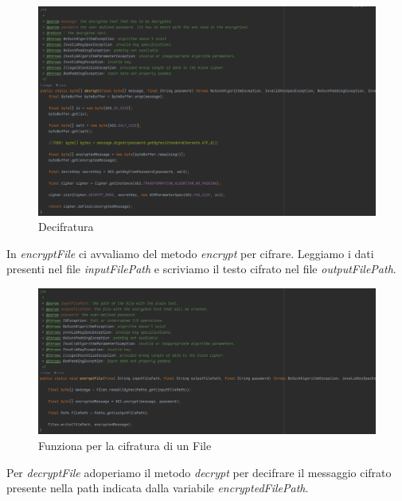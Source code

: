 \begin{figure}[H]
	\centering
	\includegraphics[width=1\textwidth, height=1\textheight, keepaspectratio]{./images/code/java/decrypt.PNG}
	\caption{Decifratura}
	\label{fig:decrypt_java}
\end{figure}


\textsf{\small In \emph{encryptFile} ci avvaliamo del metodo \emph{encrypt} per cifrare. Leggiamo i dati presenti nel file \emph{inputFilePath} e scriviamo il testo cifrato nel file \emph{outputFilePath}.}

\begin{figure}[H]
	\centering
	\includegraphics[width=1\textwidth, height=1\textheight, keepaspectratio]{./images/code/java/encryptFile.PNG}
	\caption{Funziona per la cifratura di un File}
	\label{fig:encryptFile}
\end{figure}


\textsf{\small Per \emph{decryptFile} adoperiamo il metodo \emph{decrypt} per decifrare il messaggio cifrato presente nella path indicata dalla variabile \emph{encryptedFilePath}.}

